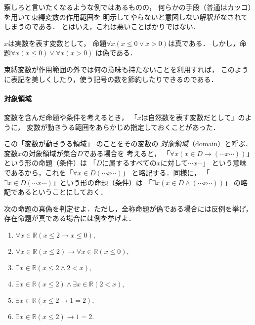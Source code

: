  察しろと言いたくなるような例ではあるものの，
 何らかの手段（普通はカッコ）を用いて束縛変数の作用範囲を
 明示してやらないと意図しない解釈がなされてしまうのである．
 とはいえ，これは悪いことばかりではない．
 
 \begin{ex}
   $x$は実数を表す変数として，
   命題$\forall x ( {x \leq 0} \lor {x > 0})$は真である．
   しかし，命題$\forall x (x \leq 0 ) \lor \forall x (x >0) $
   は偽である．
 \end{ex}
 
 束縛変数が作用範囲の外では何の意味も持たないことを利用すれば，
 このように表記を美しくしたり，使う記号の数を節約したりできるのである．

 
 \paragraph{対象領域}
 変数を含んだ命題や条件を考えるとき，
 「$x$は自然数を表す変数だとして」のように，
 変数が動きうる範囲をあらかじめ指定しておくことがあった．

 この「変数が動きうる領域」
 のことをその変数の
 \emph{対象領域}（domain）と呼ぶ．
 変数$x$の対象領域が集合$D$である場合を
 考えると，
 「$\forall x ( x \in D \to (\cdots x \cdots) )$」という形の命題（条件）は
 「$D$に属するすべての$x$に対して$\cdots x \cdots$」
 という意味であるから，これを「$\forall x \in D ( \cdots x \cdots)$」
 と略記する．同様に，
 「$\exists x \in D ( \cdots x \cdots )$」という形の命題（条件）は
 「$\exists x ( x \in D \land ( \cdots x \cdots ))$」
 の略記であるということにしておく．
 \begin{que} \label{chp:sequent.sec:hensuu.que:sokubakusingi}
   次の命題の真偽を判定せよ．ただし，全称命題が偽である場合には反例を挙げ，
   存在命題が真である場合には例を挙げよ．
  \begin{enumerate}
     \item $\forall x \in \mathbb{R} ( x \leq 2 \to x \leq 0),$ %
     \item $\forall x \in \mathbb{R} ( x \leq 2 ) %
       \to \forall x \in \mathbb{R} ( x \leq 0),$ %
     \item $\exists x \in \mathbb{R} ( x \leq 2 \land 2 < x),$ %
     \item $\exists x \in \mathbb{R} ( x \leq 2) 
            \land \exists x \in \mathbb{R} ( 2 < x),$ %
     \item $\exists x \in \mathbb{R} ( x \leq 2 \to 1=2),$ %
     \item $\exists x \in \mathbb{R} ( x \leq 2 ) \to 1=2 .$ %
   \end{enumerate}
 \end{que}
